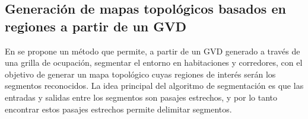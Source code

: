 

\subsection{Generación de mapas topológicos basados en regiones a partir de un GVD}\label{subsec:mapaTopGVD}
En \cite{Thrun1998} se propone un método que permite, a partir de un GVD generado a través de una grilla de ocupación, segmentar el entorno en habitaciones y corredores, con el objetivo de generar un mapa topológico cuyas regiones de interés serán los segmentos reconocidos. La idea principal del algoritmo de segmentación es que las entradas y salidas entre los segmentos son pasajes estrechos, y por lo tanto encontrar estos pasajes estrechos permite delimitar segmentos.

